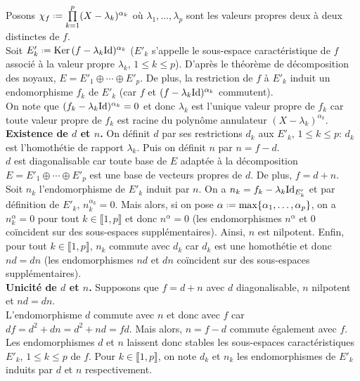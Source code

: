 \begin{solution}
    Posons $\chi_f \defeq \prod\limits_{k=1}^p (X - \lambda_k)^{\alpha_k}$ où $\lambda_1, \dots, \lambda_p$ sont les valeurs propres deux à deux distinctes de $f$. \\
    Soit $E'_k \defeq \Ker(f - \lambda_k \Id)^{\alpha_k}$ ($E'_k$ s'appelle le sous-espace caractéristique de $f$ associé à la valeur propre $\lambda_k$, $1 \leqslant k \leqslant p$). D'après le théorème de décomposition des noyaux, $E = E'_1 \oplus \cdots \oplus E'_p$. De plus, la restriction de $f$ à $E'_k$ induit un endomorphisme $f_k$ de $E'_k$ (car $f$ et $(f - \lambda_k \mathrm{Id})^{\alpha_k}$ commutent). \\
    On note que $(f_k - \lambda_k \mathrm{Id})^{\alpha_k} = 0$ et donc $\lambda_k$ est l'unique valeur propre de $f_k$ car toute valeur propre de $f_k$ est racine du polynôme annulateur $(X-\lambda_k)^{\alpha_k}$. \\
    \textbf{Existence de $d$ et $n$.} On définit $d$ par ses restrictions $d_k$ aux $E'_k$, $1 \leqslant k \leqslant p$: $d_k$ est l'homothétie de rapport $\lambda_k$. Puis on définit $n$ par $n = f-d$. \\
    $d$ est diagonalisable car toute base de $E$ adaptée à la décomposition $E = E'_1 \oplus \cdots \oplus E'_p$ est une base de vecteurs propres de $d$. De plus, $f = d + n$. \\
    Soit $n_k$ l'endomorphisme de $E'_k$ induit par $n$. On a $n_k = f_k - \lambda_k \mathrm{Id}_{E'_k}$ et par définition de $E'_k$, $n_k^{\alpha_k} = 0$. Mais alors, si on pose $\alpha \defeq \max \{ \alpha_1, \dots, \alpha_p \}$, on a $n_k^\alpha = 0$ pour tout $k \in \llbracket 1, p \rrbracket$ et donc $n^\alpha = 0$ (les endomorphismes $n^\alpha$ et $0$ coïncident sur des sous-espaces supplémentaires). Ainsi, $n$ est nilpotent. Enfin, pour tout $k \in \llbracket 1, p \rrbracket$, $n_k$ commute avec $d_k$ car $d_k$ est une homothétie et donc $nd = dn$ (les endomorphismes $nd$ et $dn$ coïncident sur des sous-espaces supplémentaires). \\
    \textbf{Unicité de $d$ et $n$.} Supposons que $f = d+n$ avec $d$ diagonalisable, $n$ nilpotent et $nd = dn$. \\
    L'endomorphisme $d$ commute avec $n$ et donc avec $f$ car $df = d^2 + dn = d^2 + nd = fd$. Mais alors, $n = f - d$ commute également avec $f$. Les endomorphismes $d$ et $n$ laissent donc stables les sous-espaces caractéristiques $E'_k$, $1 \leqslant k \leqslant p$ de $f$. Pour $k \in \llbracket 1, p \rrbracket$, on note $d_k$ et $n_k$ les endomorphismes de $E'_k$ induits par $d$ et $n$ respectivement.\\

\end{solution}
